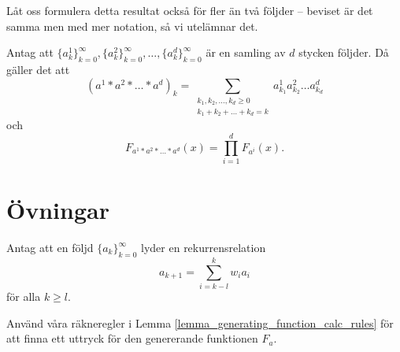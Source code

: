 \documentclass[nobib]{tufte-handout}
\begin{document}
Låt oss formulera detta resultat också för fler än två följder -- beviset är det samma men med mer notation, så vi utelämnar det.

\begin{lemma}
    Antag att $\{a^1_k\}_{k=0}^\infty, \{a^2_k\}_{k=0}^\infty, \ldots, \{a^d_k\}_{k=0}^\infty$ är en samling av $d$ stycken följder. Då gäller det att
    $$(a^1*a^2*\ldots*a^d)_k = \sum_{\substack{k_1, k_2, \ldots, k_d \geq 0\\k_1 + k_2 + \ldots + k_d = k}} a^1_{k_1}a^2_{k_2}\ldots a^d_{k_d}$$
    och
    $$F_{a^1 * a^2 * \ldots * a^d}(x) = \prod_{i=1}^{d} F_{a^i}(x).$$
\end{lemma}


\section{Övningar}

\begin{xca}
    Antag att en följd $\{a_k\}_{k=0}^\infty$ lyder en rekurrensrelation
    $$a_{k+1} = \sum_{i = k - l}^{k} w_i a_i$$
    för alla $k \geq l$.

    Använd våra räkneregler i Lemma \ref{lemma_generating_function_calc_rules} för att finna ett uttryck för den genererande funktionen $F_a$.
\end{xca}


%
%
\end{document}
